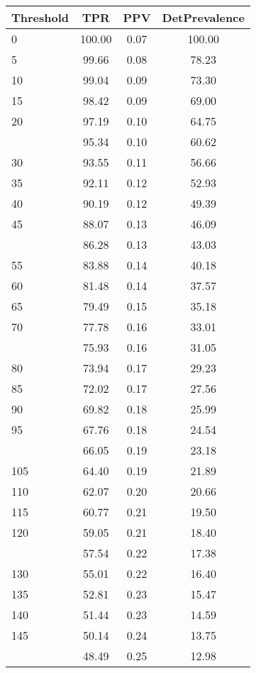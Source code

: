 \begin{table}[ht]
\centering
\begin{tabular}{lccc}
  \toprule
Threshold & TPR & PPV & DetPrevalence \\ 
  \midrule
0 & 100.00 & 0.07 & 100.00 \\ 
  5 & 99.66 & 0.08 & 78.23 \\ 
  10 & 99.04 & 0.09 & 73.30 \\ 
  15 & 98.42 & 0.09 & 69.00 \\ 
  20 & 97.19 & 0.10 & 64.75 \\ 
   \addlinespace
25 & 95.34 & 0.10 & 60.62 \\ 
  30 & 93.55 & 0.11 & 56.66 \\ 
  35 & 92.11 & 0.12 & 52.93 \\ 
  40 & 90.19 & 0.12 & 49.39 \\ 
  45 & 88.07 & 0.13 & 46.09 \\ 
   \addlinespace
50 & 86.28 & 0.13 & 43.03 \\ 
  55 & 83.88 & 0.14 & 40.18 \\ 
  60 & 81.48 & 0.14 & 37.57 \\ 
  65 & 79.49 & 0.15 & 35.18 \\ 
  70 & 77.78 & 0.16 & 33.01 \\ 
   \addlinespace
75 & 75.93 & 0.16 & 31.05 \\ 
  80 & 73.94 & 0.17 & 29.23 \\ 
  85 & 72.02 & 0.17 & 27.56 \\ 
  90 & 69.82 & 0.18 & 25.99 \\ 
  95 & 67.76 & 0.18 & 24.54 \\ 
   \addlinespace
100 & 66.05 & 0.19 & 23.18 \\ 
  105 & 64.40 & 0.19 & 21.89 \\ 
  110 & 62.07 & 0.20 & 20.66 \\ 
  115 & 60.77 & 0.21 & 19.50 \\ 
  120 & 59.05 & 0.21 & 18.40 \\ 
   \addlinespace
125 & 57.54 & 0.22 & 17.38 \\ 
  130 & 55.01 & 0.22 & 16.40 \\ 
  135 & 52.81 & 0.23 & 15.47 \\ 
  140 & 51.44 & 0.23 & 14.59 \\ 
  145 & 50.14 & 0.24 & 13.75 \\ 
   \addlinespace
150 & 48.49 & 0.25 & 12.98 \\ 

\end{tabular}
\end{table}
